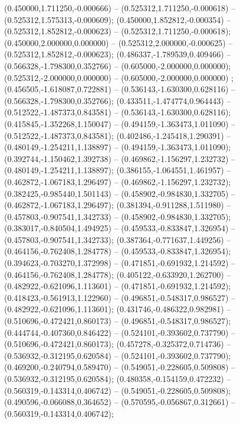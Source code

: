  (0.450000,1.711250,-0.000666) -- (0.525312,1.711250,-0.000618) -- (0.525312,1.575313,-0.000609);
 (0.450000,1.852812,-0.000354) -- (0.525312,1.852812,-0.000623) -- (0.525312,1.711250,-0.000618);
 (0.450000,2.000000,0.000000) -- (0.525312,2.000000,-0.000625) -- (0.525312,1.852812,-0.000623);
 (0.486337,-1.789539,0.409466) -- (0.566328,-1.798300,0.352766) -- (0.605000,-2.000000,0.000000);
 (0.525312,-2.000000,0.000000) -- (0.605000,-2.000000,0.000000) ;
 (0.456505,-1.618087,0.722881) -- (0.536143,-1.630300,0.628116) -- (0.566328,-1.798300,0.352766);
 (0.433511,-1.474774,0.964443) -- (0.512522,-1.487373,0.843581) -- (0.536143,-1.630300,0.628116);
 (0.415845,-1.352268,1.150047) -- (0.494159,-1.363473,1.011090) -- (0.512522,-1.487373,0.843581);
 (0.402486,-1.245418,1.290391) -- (0.480149,-1.254211,1.138897) -- (0.494159,-1.363473,1.011090);
 (0.392744,-1.150462,1.392738) -- (0.469862,-1.156297,1.232732) -- (0.480149,-1.254211,1.138897);
 (0.386155,-1.064551,1.461957) -- (0.462872,-1.067183,1.296497) -- (0.469862,-1.156297,1.232732);
 (0.382425,-0.985440,1.501143) -- (0.458902,-0.984830,1.332705) -- (0.462872,-1.067183,1.296497);
 (0.381394,-0.911288,1.511980) -- (0.457803,-0.907541,1.342733) -- (0.458902,-0.984830,1.332705);
 (0.383017,-0.840504,1.494925) -- (0.459533,-0.833847,1.326954) -- (0.457803,-0.907541,1.342733);
 (0.387364,-0.771637,1.449256) -- (0.464156,-0.762408,1.284778) -- (0.459533,-0.833847,1.326954);
 (0.394623,-0.703270,1.372998) -- (0.471851,-0.691932,1.214592) -- (0.464156,-0.762408,1.284778);
 (0.405122,-0.633920,1.262700) -- (0.482922,-0.621096,1.113601) -- (0.471851,-0.691932,1.214592);
 (0.418423,-0.561913,1.122960) -- (0.496851,-0.548317,0.986527) -- (0.482922,-0.621096,1.113601);
 (0.431746,-0.486322,0.982981) -- (0.510696,-0.472421,0.860173) -- (0.496851,-0.548317,0.986527);
 (0.444744,-0.407360,0.846422) -- (0.524101,-0.393602,0.737790) -- (0.510696,-0.472421,0.860173);
 (0.457278,-0.325372,0.714736) -- (0.536932,-0.312195,0.620584) -- (0.524101,-0.393602,0.737790);
 (0.469200,-0.240794,0.589470) -- (0.549051,-0.228605,0.509808) -- (0.536932,-0.312195,0.620584);
 (0.480358,-0.154159,0.472232) -- (0.560319,-0.143314,0.406742) -- (0.549051,-0.228605,0.509808);
 (0.490596,-0.066088,0.364652) -- (0.570595,-0.056867,0.312661) -- (0.560319,-0.143314,0.406742);
